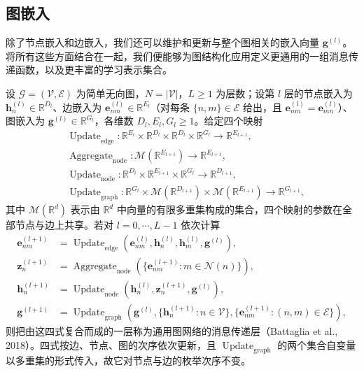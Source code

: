 \documentclass[../../main.tex]{subfiles}
\begin{document}
\subsection{图嵌入}\label{subsection:ch13-图嵌入}

除了节点嵌入和边嵌入，我们还可以维护和更新与整个图相关的嵌入向量 $\bm{g}^{(l)}$。将所有这些方面结合在一起，我们便能够为图结构化应用定义更通用的一组消息传递函数，以及更丰富的学习表示集合。

\begin{definition}[通用图网络的消息传递方程]\label{definition:ch13-通用消息传递}
设 $\mathcal{G}=(\mathcal{V},\mathcal{E})$ 为简单无向图，$N=|\mathcal{V}|$，$L\geqslant1$ 为层数；设第 $l$ 层的节点嵌入为 $\bm{h}_n^{(l)}\in\mathbb{R}^{D_l}$、边嵌入为 $\bm{e}_{nm}^{(l)}\in\mathbb{R}^{E_l}$（对每条 $\{n,m\}\in\mathcal{E}$ 给出，且 $\bm{e}_{nm}^{(l)}=\bm{e}_{mn}^{(l)}$）、图嵌入为 $\bm{g}^{(l)}\in\mathbb{R}^{G_l}$，各维数 $D_l,E_l,G_l\geqslant1$。给定四个映射
\begin{align*}
&\operatorname{Update}_{\mathrm{edge}}:\mathbb{R}^{E_l}\times\mathbb{R}^{D_l}\times\mathbb{R}^{D_l}\times\mathbb{R}^{G_l}\to\mathbb{R}^{E_{l+1}},\\
&\operatorname{Aggregate}_{\mathrm{node}}:\mathcal{M}(\mathbb{R}^{E_{l+1}})\to\mathbb{R}^{E_{l+1}},\\
&\operatorname{Update}_{\mathrm{node}}:\mathbb{R}^{D_l}\times\mathbb{R}^{E_{l+1}}\times\mathbb{R}^{G_l}\to\mathbb{R}^{D_{l+1}},\\
&\operatorname{Update}_{\mathrm{graph}}:\mathbb{R}^{G_l}\times\mathcal{M}(\mathbb{R}^{D_{l+1}})\times\mathcal{M}(\mathbb{R}^{E_{l+1}})\to\mathbb{R}^{G_{l+1}},
\end{align*}
其中 $\mathcal{M}(\mathbb{R}^{d})$ 表示由 $\mathbb{R}^{d}$ 中向量的有限多重集构成的集合，四个映射的参数在全部节点与边上共享。若对 $l=0,\cdots,L-1$ 依次计算
\begin{align}
\bm{e}_{nm}^{(l+1)}&=\operatorname{Update}_{\mathrm{edge}}\!\left(\bm{e}_{nm}^{(l)},\bm{h}_n^{(l)},\bm{h}_m^{(l)},\bm{g}^{(l)}\right),
\label{align:ch13-通用边更新}\\
\bm{z}_n^{(l+1)}&=\operatorname{Aggregate}_{\mathrm{node}}\!\left(\{\bm{e}_{nm}^{(l+1)}:m\in\mathcal{N}(n)\}\right),
\label{align:ch13-通用边聚合}\\
\bm{h}_n^{(l+1)}&=\operatorname{Update}_{\mathrm{node}}\!\left(\bm{h}_n^{(l)},\bm{z}_n^{(l+1)},\bm{g}^{(l)}\right),
\label{align:ch13-通用节点更新}\\
\bm{g}^{(l+1)}&=\operatorname{Update}_{\mathrm{graph}}\!\left(\bm{g}^{(l)},\{\bm{h}_n^{(l+1)}:n\in\mathcal{V}\},\{\bm{e}_{nm}^{(l+1)}:(n,m)\in\mathcal{E}\}\right),
\label{align:ch13-通用图更新}
\end{align}
则把由这四式复合而成的一层称为通用图网络的消息传递层（Battaglia et al., 2018）。四式按边、节点、图的次序依次更新，且 $\operatorname{Update}_{\mathrm{graph}}$ 的两个集合自变量以多重集的形式传入，故它对节点与边的枚举次序不变。
\end{definition}
\end{document}
